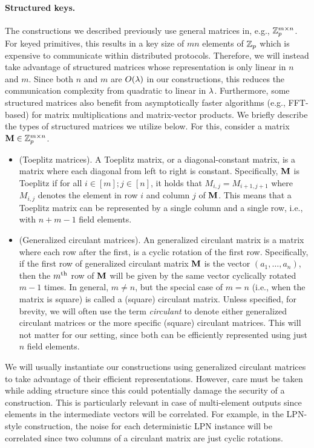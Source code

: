 \paragraph{Structured keys.}
The constructions we described previously use general matrices in, e.g., $\mathbb{Z}_p^{m \times n}$. For keyed primitives, this results in a key size of $mn$ elements of $\mathbb{Z}_p$ which is expensive to communicate within distributed protocols. Therefore, we will instead take advantage of structured matrices whose representation is only linear in $n$ and $m$. Since both $n$ and $m$ are $O(\lambda)$ in our constructions, this reduces the communication complexity from quadratic to linear in $\lambda$. Furthermore, some structured matrices also benefit from asymptotically faster algorithms (e.g., FFT-based) for matrix multiplications and matrix-vector products. We briefly describe the types of structured matrices we utilize below. For this, consider a matrix $\mat{M} \in \Z_p^{m \times n}$.

\begin{itemize}
    \item (Toeplitz matrices).
    A Toeplitz matrix, or a diagonal-constant matrix, is a matrix where each diagonal from left to right is constant. Specifically, $\mat{M}$ is Toeplitz if for all $i \in [m]; j \in [n]$, it holds that $M_{i,j} = M_{i+1, j+1}$ where $M_{i,j}$ denotes the element in row $i$ and column $j$ of $\mat{M}$. This means that a Toeplitz matrix can be represented by a single column and a single row, i.e., with $n + m - 1$ field elements.

    \item (Generalized circulant matrices). 
    An generalized circulant matrix is a matrix where each row after the first, is a cyclic rotation of the first row. Specifically, if the first row of generalized circulant matrix $\mat{M}$ is the vector $(a_1, \dots, a_n)$, then the $m^{\textnormal{th}}$ row of $\mat{M}$ will be given by the same vector cyclically rotated $m-1$ times. In general, $m \neq n$, but the special case of $m = n$ (i.e., when the matrix is square) is called a (square) circulant matrix. Unless specified, for brevity, we will often use the term \textit{circulant} to denote either generalized circulant matrices or the more specific (square) circulant matrices. This will not matter for our setting, since both can be efficiently represented using just $n$ field elements.
\end{itemize}

We will usually instantiate our constructions using generalized circulant matrices to take advantage of their efficient representations. However, care must be taken while adding structure since this could potentially damage the security of a construction. This is particularly relevant in case of multi-element outputs since elements in the intermediate vectors will be correlated. For example, in the LPN-style construction, the noise for each deterministic LPN instance will be correlated since two columns of a circulant matrix are just cyclic rotations. 

